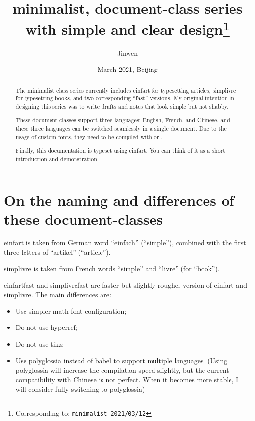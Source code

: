\documentclass{einfart}
\providecommand{\minimalist}{\textsf{minimalist}}
\providecommand{\einfart}{\textsf{einfart}}
\providecommand{\einfartfast}{\textsf{einfartfast}}
\providecommand{\simplivre}{\textsf{simplivre}}
\providecommand{\simplivrefast}{\textsf{simplivrefast}}
\begin{document}
\title{\minimalist{}, document-class series with simple and clear design\thanks{Corresponding to: \texttt{\minimalist{} 2021/03/12}}}
\author{Jinwen}
\date{March 2021, Beijing}

\maketitle

\begin{abstract}
    The \minimalist{} class series currently includes \einfart{} for typesetting articles, \simplivre{} for typesetting books, and two corresponding ``fast'' versions. My original intention in designing this series was to write drafts and notes that look simple but not shabby.

    These document-classes support three languages: English, French, and Chinese, and these three languages can be switched seamlessly in a single document. Due to the usage of custom fonts, they need to be compiled with  or .
    
    Finally, this documentation is typeset using \einfart{}. You can think of it as a short introduction and demonstration.
\end{abstract}

\tableofcontents

\section{On the naming and differences of these document-classes}
\einfart{} is taken from German word ``einfach'' (``simple''), combined with the first three letters of ``artikel'' (``article'').

\simplivre{} is taken from French words ``simple'' and ``livre'' (for ``book'').

\einfartfast{} and \simplivrefast{} are faster but slightly rougher version of \einfart{} and \simplivre{}. The main differences are:
\begin{itemize}
    \item Use simpler math font configuration; 
    \item Do not use hyperref; 
    \item Do not use tikz; 
    \item Use polyglossia instead of babel to support multiple languages. (Using polyglossia will increase the compilation speed slightly, but the current compatibility with Chinese is not perfect. When it becomes more stable, I will consider fully switching to polyglossia)
\end{itemize}
\end{document}
